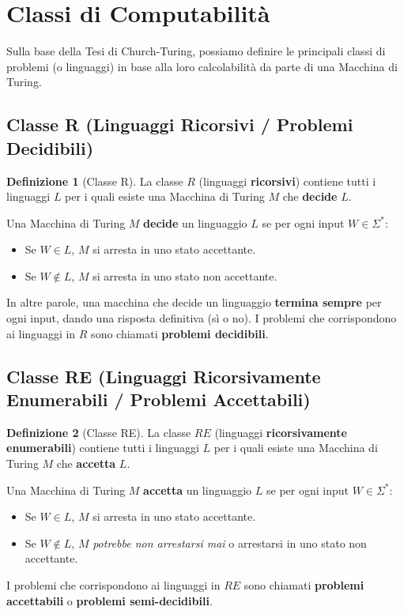 \documentclass[a4paper]{article}
\theoremstyle{definition} %
\newtheorem{definition}{Definizione}
\begin{document}
\section{Classi di Computabilità}

Sulla base della Tesi di Church-Turing, possiamo definire le principali classi di problemi (o linguaggi) in base alla loro calcolabilità da parte di una Macchina di Turing.


\subsection{Classe R (Linguaggi Ricorsivi / Problemi Decidibili)}
\begin{definition}[Classe R]
La classe $R$ (linguaggi \textbf{ricorsivi}) contiene tutti i linguaggi $L$ per i quali esiste una Macchina di Turing $M$ che \textbf{decide} $L$.
\end{definition}
Una Macchina di Turing $M$ \textbf{decide} un linguaggio $L$ se per ogni input $W \in \Sigma^*$:
\begin{itemize}
    \item Se $W \in L$, $M$ si arresta in uno stato accettante.
    \item Se $W \notin L$, $M$ si arresta in uno stato non accettante.
\end{itemize}
In altre parole, una macchina che decide un linguaggio \textbf{termina sempre} per ogni input, dando una risposta definitiva (sì o no). I problemi che corrispondono ai linguaggi in $R$ sono chiamati \textbf{problemi decidibili}.

\subsection{Classe RE (Linguaggi Ricorsivamente Enumerabili / Problemi Accettabili)}
\begin{definition}[Classe RE]
La classe $RE$ (linguaggi \textbf{ricorsivamente enumerabili}) contiene tutti i linguaggi $L$ per i quali esiste una Macchina di Turing $M$ che \textbf{accetta} $L$.
\end{definition}
Una Macchina di Turing $M$ \textbf{accetta} un linguaggio $L$ se per ogni input $W \in \Sigma^*$:
\begin{itemize}
    \item Se $W \in L$, $M$ si arresta in uno stato accettante.
    \item Se $W \notin L$, $M$ \emph{potrebbe non arrestarsi mai} o arrestarsi in uno stato non accettante.
\end{itemize}
I problemi che corrispondono ai linguaggi in $RE$ sono chiamati \textbf{problemi accettabili} o \textbf{problemi semi-decidibili}.
\end{document}
